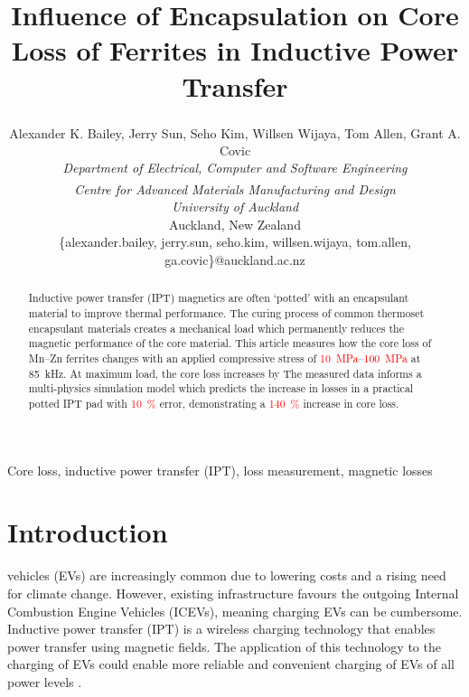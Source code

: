 \documentclass[conference]{IEEEtran}
\begin{document}
\title{Influence of Encapsulation on Core Loss of Ferrites in Inductive Power Transfer}

\author{
  Alexander K. Bailey, Jerry Sun\textsuperscript{\textdagger}, Seho Kim, Willsen Wijaya\textsuperscript{\textdagger}, Tom Allen\textsuperscript{\textdagger}, Grant A. Covic\\
  \textit{Department of Electrical, Computer and Software Engineering}\\
  \textit{\textsuperscript{\textdagger}Centre for Advanced Materials Manufacturing and Design}\\
  \textit{University of Auckland}\\
  Auckland, New Zealand\\
  \{alexander.bailey, jerry.sun, seho.kim, willsen.wijaya, tom.allen, ga.covic\}@auckland.ac.nz\\ 
}
\maketitle
\thispagestyle{plain}
\pagestyle{plain}

\begin{abstract}
  Inductive power transfer (IPT) magnetics are often `potted' with an encapsulant material to improve thermal performance.
  The curing process of common thermoset encapsulant materials creates a mechanical load which permanently reduces the magnetic performance of the core material. 
  This article measures how the core loss of Mn--Zn ferrites changes with an applied compressive stress of \textcolor{red}{\SIrange{10}{100}{\mega\pascal}} at \SI{85}{\kilo\hertz}. 
  At maximum load, the core loss increases by 
  The measured data informs a multi-physics simulation model which predicts the increase in losses in a practical potted IPT pad with \textcolor{red}{\SI{10}{\percent}} error, demonstrating a \textcolor{red}{\SI{140}{\percent}} increase in core loss. 
\end{abstract}

\begin{IEEEkeywords}
Core loss, inductive power transfer (IPT), loss measurement, magnetic losses
\end{IEEEkeywords}

\section{Introduction}

 vehicles (EVs) are increasingly common due to lowering costs and a rising need for climate change. 
However, existing infrastructure favours the outgoing Internal Combustion Engine Vehicles (ICEVs), meaning charging EVs can be cumbersome. 
Inductive power transfer (IPT) is a wireless charging technology that enables power transfer using magnetic fields. 
The application of this technology to the charging of EVs could enable more reliable and convenient charging of EVs of all power levels \cite{covicModernTrendsInductive2013b}. 
\end{document}
